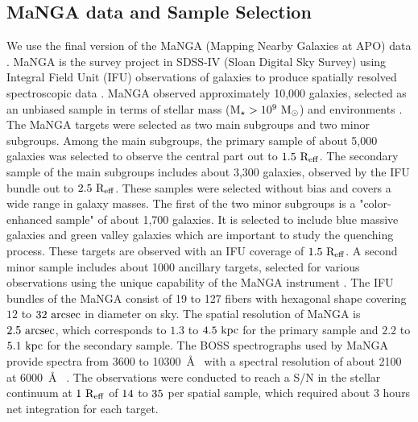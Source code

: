 \documentclass[fleqn,usenatbib]{mnras}
\begin{document}
\subsection{MaNGA data and Sample Selection} \label{sec:sample}

We use the final version of the MaNGA (Mapping Nearby Galaxies at APO) data \citep{mangadr17}.
MaNGA is the survey project in SDSS-IV (Sloan Digital Sky Survey)
using  Integral Field Unit (IFU) observations of galaxies 
to produce spatially resolved spectroscopic data \citep{manga_overview,Blanton2017,Gunn2006,Drory2015,mangadr15,mangadr17}. 
MaNGA observed approximately 10,000 galaxies, 
selected as an unbiased sample in terms of 
stellar mass ($\rm M_{\star} > 10^{9}~M_{\odot}$) and environments
\citep{Law2015,Wake2017,Yan2016a}. 
The MaNGA targets were selected as two main subgroups and two minor subgroups. 
Among the main subgroups, the primary sample of about 5,000 galaxies was selected 
to observe the central part out to $\rm 1.5~R_{eff}$. 
The secondary sample of the main subgroups includes about 3,300 galaxies, 
observed by the IFU bundle out to $\rm 2.5~R_{eff}$. These samples were selected without bias and covers a wide range in galaxy masses.
The first of the two minor subgroups is a "color-enhanced sample" of about 1,700 galaxies.
It is selected to include blue massive galaxies and green valley galaxies 
which are important to study the quenching process.
These targets are observed with an IFU coverage of $\rm 1.5~R_{eff}$.
A second minor sample includes about 1000 ancillary targets, selected for various observations using the unique capability of the MaNGA instrument \citep{Yan2016a}.
The IFU bundles of the MaNGA consist of 19 to 127 fibers with hexagonal shape 
covering $12$ to $\rm 32~arcsec$ in diameter on sky. 
The spatial resolution of MaNGA is $\rm 2.5~arcsec$, 
which corresponds to $1.3$ to $\rm 4.5~kpc$ for the primary sample and 
$2.2$ to $\rm 5.1~kpc$ for the secondary sample. 
The BOSS spectrographs used by MaNGA provide spectra from 3600 to 10300~\AA~
with a spectral resolution of about 2100 at 6000~\AA~
\citep{BOSS,Yan2016b}. 
The observations were conducted to reach a S/N in the stellar continuum at $\rm 1~R_{eff}$ of $\rm 14$ to $\rm 35$ per spatial sample, 
which required about 3 hours net integration for each target.



\end{document}
